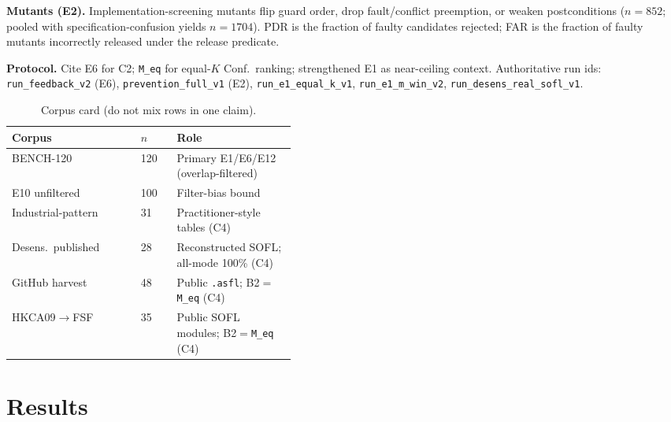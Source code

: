 \documentclass[10pt,conference]{IEEEtran}
\newcommand{\runin}[1]{\medskip\noindent\textbf{#1}\enspace}
\begin{document}
\runin{Mutants (E2).}
Implementation-screening mutants flip guard order, drop fault/conflict
preemption, or weaken postconditions ($n{=}852$; pooled with
specification-confusion yields $n{=}1704$).
PDR is the fraction of faulty candidates rejected; FAR is the fraction of
faulty mutants incorrectly released under the release predicate.

\runin{Protocol.}
Cite E6 for C2; \texttt{M\_eq} for equal-$K$ Conf.\ ranking; strengthened E1
as near-ceiling context.
Authoritative run ids: \texttt{run\_feedback\_v2} (E6),
\texttt{prevention\_full\_v1} (E2), \texttt{run\_e1\_equal\_k\_v1},
\texttt{run\_e1\_m\_win\_v2}, \texttt{run\_desens\_real\_sofl\_v1}.

\begin{table}[t]
\centering
\caption{Corpus card (do not mix rows in one claim).}
\label{tab:corpus}
\footnotesize
\begin{tabular}{@{}llp{0.42\linewidth}@{}}
\toprule
Corpus & $n$ & Role \\
\midrule
BENCH-120 & 120 & Primary E1/E6/E12 (overlap-filtered) \\
E10 unfiltered & 100 & Filter-bias bound \\
Industrial-pattern & 31 & Practitioner-style tables (C4) \\
Desens.\ published & 28 & Reconstructed SOFL; all-mode 100\% (C4) \\
GitHub harvest & 48 & Public \texttt{.asfl}; B2${=}$\texttt{M\_eq} (C4) \\
HKCA09$\rightarrow$FSF & 35 & Public SOFL modules; B2${=}$\texttt{M\_eq} (C4) \\
\bottomrule
\end{tabular}
\end{table}

\section{Results}
\end{document}
